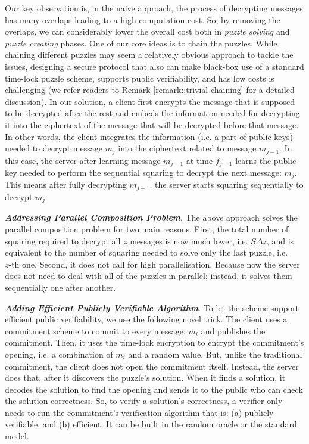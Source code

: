  Our key observation is, in the naive approach, the process of decrypting  messages has many overlaps  leading to a high  computation cost. So,  by removing the overlaps, we can considerably lower the overall cost both in \emph{puzzle solving} and \emph{puzzle creating} phases.  One of our core ideas  is to chain the puzzles. While chaining different puzzles may seem a relatively obvious approach to tackle the  issues, designing a secure protocol that also can make black-box use of a standard time-lock puzzle scheme, supports public verifiability, and has low costs is challenging (we refer readers to Remark \ref{remark::trivial-chaining} for a detailed discussion). In our solution, a client  first encrypts the message  that is supposed to be decrypted after the rest and embeds the information needed for decrypting it into the ciphertext of the message that will be decrypted before that message. In other words, the client integrates the information (i.e. a part of public keys) needed to decrypt message $m_{\scriptscriptstyle j}$ into the ciphertext related to message $m_{\scriptscriptstyle j-1}$. In this case, the server after learning message $m_{\scriptscriptstyle j-1}$ at time $f_{\scriptscriptstyle j-1}$ learns the public key needed to perform the sequential squaring to decrypt the next message: $m_{\scriptscriptstyle j}$. This means after fully decrypting $m_{\scriptscriptstyle j-1}$, the server starts  squaring sequentially to decrypt $m_{\scriptscriptstyle j}$
  
  
  
  \noindent\textit{\textbf{Addressing Parallel Composition Problem}}.  The above approach solves the parallel composition problem for two main reasons.  First, the total  number of squaring required to decrypt all $z$ messages is now much lower, i.e. $S \Delta z$, and is equivalent to the number of squaring needed to solve only the last puzzle,  i.e. $z\text{-th}$ one. Second, it does not call for  high parallelisation. Because now the server does not need to deal with all of the puzzles in parallel; instead, it solves them sequentially one after another.  
  
  
  
  \noindent\textit{\textbf{Adding Efficient Publicly Verifiable Algorithm}}. To let the  scheme  support  efficient public verifiability, we use the following novel trick. The client uses a commitment scheme to commit to every message: $m_{\scriptscriptstyle i}$ and publishes the  commitment. Then, it uses the time-lock encryption to encrypt the commitment's opening, i.e. a combination of $m_{\scriptscriptstyle i}$ and a random value. But, unlike the traditional commitment, the client does not open the commitment itself. Instead, the server does that, after it discovers the puzzle's solution.  When it finds a solution, it decodes the solution to find the opening and sends it to the public who can check the solution correctness. So, to verify  a solution's correctness,   a verifier  only needs to run the commitment's verification algorithm that is: (a)  publicly verifiable, and (b)   efficient. It can be built in the random oracle  or  the standard model.
  
